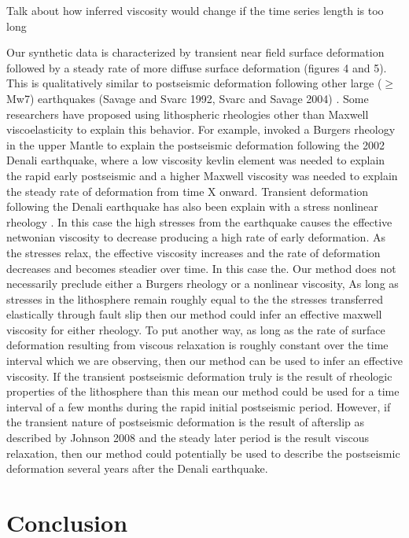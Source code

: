 \documentclass[extra]{gji}
\begin{document}
Talk about how inferred viscosity would change if the time series length is too long

Our synthetic data is characterized by transient near field surface
deformation followed by a steady rate of more diffuse surface
deformation (figures 4 and 5).  This is qualitatively similar to
postseismic deformation following other large ($\geq$ Mw7) earthquakes
(Savage and Svarc 1992, Svarc and Savage 2004) \citep[e.g.][]{E2009,R2015}.  Some researchers have proposed using
lithospheric rheologies other than Maxwell viscoelasticity to explain
this behavior.  For example, \citet{P2005} invoked a
Burgers rheology in the upper Mantle to explain the postseismic
deformation following the 2002 Denali earthquake, where a low viscosity kevlin
element was needed to explain the rapid early postseismic and a higher
Maxwell viscosity was needed to explain the steady rate of deformation
from time X onward.  Transient deformation following the Denali earthquake has also been explain with
a stress nonlinear rheology \citep{F2006b}.  In this case the high
stresses from the earthquake causes the effective netwonian viscosity
to decrease producing a high rate of early deformation.  As the
stresses relax, the effective viscosity increases and the rate of
deformation decreases and becomes steadier over time.  In this case
the. Our method does not necessarily preclude either a Burgers
rheology or a nonlinear viscosity, As long as stresses in the
lithosphere remain roughly equal to the the stresses transferred
elastically through fault slip then our method could infer an
effective maxwell viscosity for either rheology.  To put another way,
as long as the rate of surface deformation resulting from viscous
relaxation is roughly constant over the time interval which we are
observing, then our method can be used to infer an effective
viscosity. If the transient postseismic deformation truly is the
result of rheologic properties of the lithosphere than this mean our
method could be used for a time interval of a few months during the
rapid initial postseismic period. However, if the transient nature of
postseismic deformation is the result of afterslip as described by Johnson 2008
and the steady later period is the result viscous relaxation, then our
method could potentially be used to describe the postseismic
deformation several years after the Denali earthquake.

\section{Conclusion}
\end{document}

